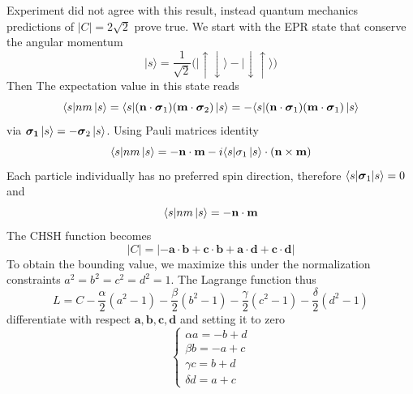 \documentclass[../../../main.tex]{subfiles}
\begin{document}
Experiment did not agree with this result, instead quantum mechanics predictions of $|C| = 2 \sqrt{2}$ prove true.
We start with the EPR state that conserve the angular momentum
\begin{equation*}
  \lvert s\rangle = \frac{1}{\sqrt{2}}\bigl(\lvert\uparrow \downarrow\rangle - \lvert\downarrow\uparrow\rangle\bigr)
\end{equation*}
Then The expectation value in this state reads
\begin{equation*}
  \langle s| nm \ket{s} = \langle s|(\mathbf{n}\cdot\boldsymbol\sigma_1)(\mathbf m\cdot\boldsymbol\sigma_2)\ket{s} = -\langle s|(\mathbf{n}\cdot\boldsymbol\sigma_1)(\mathbf{m}\cdot\boldsymbol\sigma_1)\ket{s}
\end{equation*}
via $\boldsymbol{\sigma_1} \ket{s} = - \boldsymbol{\sigma}_2 \ket{s}$.
Using Pauli matrices identity
\begin{equation*}
  \langle s| nm \ket{s}  = - \mathbf n\cdot\mathbf m - i\langle s|\sigma_1\ket{s}\cdot(\mathbf n\times\mathbf m)
\end{equation*}
Each particle individually has no preferred spin direction, therefore $\braket{s  | \boldsymbol{\sigma}_1|s}=0$ and
\begin{equation*}
  \langle s| nm \ket{s}  = - \mathbf n\cdot\mathbf m
\end{equation*}
The CHSH function becomes
\begin{equation*}
  |C| = \left| -\mathbf{a}\cdot \mathbf{b} + \mathbf{c}\cdot \mathbf{b} + \mathbf{a}\cdot \mathbf{d} + \mathbf{c}\cdot \mathbf{d} \right|
\end{equation*}
To obtain the bounding value, we maximize this under the normalization constraints $a ^{2}=b ^{2} = c ^{2} = d ^{2}=1$.
The Lagrange function thus
\begin{equation*}
  L = C - \frac{\alpha}{2}\left(a^2 - 1\right) - \frac{\beta}{2}\left(b^2 - 1\right) - \frac{\gamma}{2}\left(c^2 - 1\right) - \frac{\delta}{2}\left(d^2 - 1\right)
\end{equation*}
differentiate with respect $\mathbf{a},\mathbf{b},\mathbf{c},\mathbf{d}$ and setting it to zero
\begin{equation*}
  \begin{cases}
    \alpha a = -b + d \\
    \beta b  = -a + c \\
    \gamma c = b + d  \\
    \delta d = a + c
  \end{cases}
\end{equation*}
\end{document}
